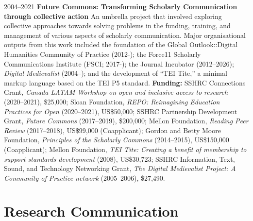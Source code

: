 \documentclass[11pt,letterpaper,sans]{moderncv}
\newcommand{\cvheading}[2]{%
  \Needspace{#1}%
  \section{#2}
}
\begin{document}
{\cventry
   {2004--2021}
   {\textbf{Future Commons: Transforming Scholarly Communication through collective action}}
   {}
   {}
   {An umbrella project that involved exploring collective approaches towards solving problems in the funding, training, and management of various aspects of scholarly communication. Major organisational outputs from this work included the foundation of the Global Outlook::Digital Humanities Community of Practice (2012-); the Force11 Scholarly Communications Institute (FSCI; 2017-); the Journal Incubator (2012--2026); \textit{Digital Medievalist} (2004--); and the development of “TEI Tite,” a minimal markup language based on the TEI P5 standard.}
   {\textbf{Funding:} SSHRC Connections Grant, \textit{Canada-LATAM Workshop on open and inclusive access to research} (2020--2021), \$25,000; Sloan Foundation, \textit{REPO: Reimagining Education Practices for Open} (2020--2021), US\$50,000; SSHRC Partnership Development Grant, \textit{Future Commons} (2017--2019), \$200,000; Mellon Foundation, \textit{Reading Peer Review} (2017--2018), US\$99,000 (Coapplicant); Gordon and Betty Moore Foundation, \textit{Principles of the Scholarly Commons} (2014--2015), US\$150,000 (Coapplicant); Mellon Foundation, \textit{TEI Tite: Creating a benefit of membership to support standards development} (2008), US\$30,723; SSHRC Information, Text, Sound, and Technology Networking Grant, \textit{The Digital Medievalist Project: A Community of Practice network} (2005--2006), \$27,490.}

\cvheading{10\baselineskip}{\textbf{Research Communication}}


}
\end{document}
